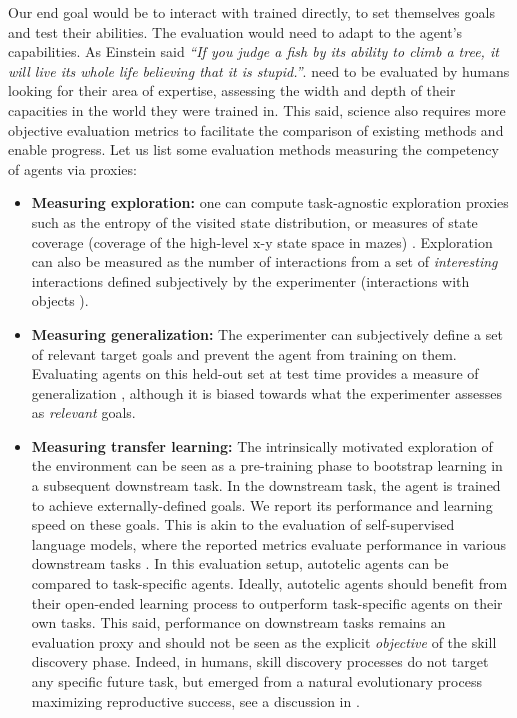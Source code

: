 Our end goal would be to interact with trained \rlimgep directly, to set themselves goals and test their abilities. The evaluation would need to adapt to the agent's capabilities. As Einstein said \textit{``If you judge a fish by its ability to climb a tree, it will live its whole life believing that it is stupid.''}. \rlimgep need to be evaluated by humans looking for their area of expertise, assessing the width and depth of their capacities in the world they were trained in. This said, science also requires more objective evaluation metrics to facilitate the comparison of existing methods and enable progress. Let us list some evaluation methods measuring the competency of agents via proxies:

\begin{itemize}
    \item \textbf{Measuring exploration:} one can compute task-agnostic exploration proxies such as the entropy of the
    visited state distribution, or measures of state coverage (\eg coverage of the high-level x-y state space in mazes) \citep{goalgan}. Exploration can also be measured as the number of interactions from a set of \textit{interesting} interactions defined subjectively by the experimenter (interactions with objects \citet{imagine}).
    \item \textbf{Measuring generalization:} The experimenter can subjectively define a set of relevant target goals
    and prevent the agent from training on them. Evaluating agents on this held-out set at test time provides a measure of generalization \citep{ruis2020benchmark}, although it is biased towards what the experimenter assesses as \textit{relevant} goals.
    \item \textbf{Measuring transfer learning:} The intrinsically motivated exploration of the environment can be seen as a pre-training phase to bootstrap learning in a subsequent downstream task. In the downstream task, the agent is trained to achieve externally-defined goals. We report its performance and learning speed on these goals. This is akin to the evaluation of self-supervised language models, where the reported metrics evaluate performance in various downstream tasks \citep{brown2020language}. In this evaluation setup, autotelic agents can be compared to task-specific agents. Ideally, autotelic agents should benefit from their open-ended learning process to outperform task-specific agents on their own tasks. This said, performance on downstream tasks remains an evaluation proxy and should not be seen as the explicit \textit{objective} of the skill discovery phase. Indeed, in humans, skill discovery processes do not target any specific future task, but emerged from a natural evolutionary process maximizing reproductive success, see a discussion in \citep{singh2010intrinsically}.

\end{itemize}
